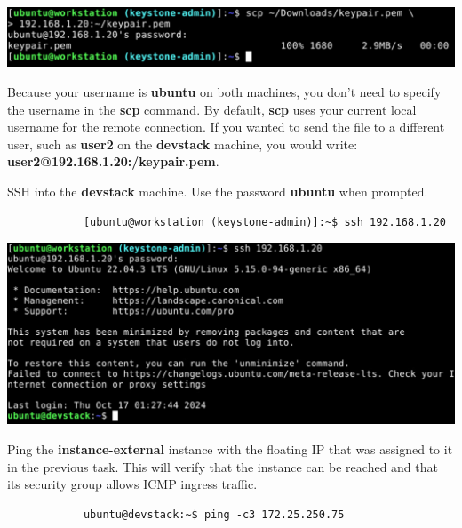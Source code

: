 \documentclass[letterpaper, 12pt]{article}
\begin{document}
\begin{enumerate}
\begin{labstep}
        \begin{center}
            \includegraphics[width=\linewidth]{images/part5/step38.png}
        \end{center}
    \end{labstep}

    \begin{notebox}
        Because your username is \textbf{ubuntu} on both machines, you don't need to specify the username in the \textbf{scp} command.
        By default, \textbf{scp} uses your current local username for the remote connection.
        If you wanted to send the file to a different user, such as \textbf{user2} on the \textbf{devstack} machine, you would write: \textbf{user2@192.168.1.20:\texttildemid/keypair.pem}.
    \end{notebox}

    \begin{labstep}
        SSH into the \textbf{devstack} machine.
        Use the password \textbf{ubuntu} when prompted.
        \begin{lstlisting}
            [ubuntu@workstation (keystone-admin)]:~$ ssh 192.168.1.20
        \end{lstlisting}

        \begin{center}
            \includegraphics[width=\linewidth]{images/part5/step39.png}
        \end{center}
    \end{labstep}

    \begin{labstep}
        Ping the \textbf{instance-external} instance with the floating IP that was assigned to it in the previous task.
        This will verify that the instance can be reached and that its security group allows ICMP ingress traffic.
        \begin{lstlisting}
            ubuntu@devstack:~$ ping -c3 172.25.250.75
        \end{lstlisting}


\end{labstep}
\end{enumerate}
\end{document}
